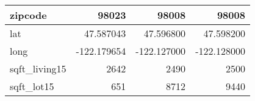 \begin{table}[H]
\begin{tabular}{|l|r|r|r|}
\hline zipcode & \cellcolor[rgb]{0.9, 0.54, 0.52} 98023 & 98008 & 98008 \\
\hline lat & \cellcolor[rgb]{0.9, 0.54, 0.52} 47.587043 & 47.596800 & 47.598200 \\
\hline long & \cellcolor[rgb]{0.9, 0.54, 0.52} -122.179654 & \cellcolor[rgb]{0.9, 0.54, 0.52} -122.127000 & \cellcolor[rgb]{0.9, 0.54, 0.52} -122.128000 \\
\hline sqft\_living15 & \cellcolor[rgb]{0.9, 0.54, 0.52} 2642 & 2490 & 2500 \\
\hline sqft\_lot15 & \cellcolor[rgb]{0.9, 0.54, 0.52} 651 & 8712 & 9440 \\
\hline
\end{tabular}
\end{table}
